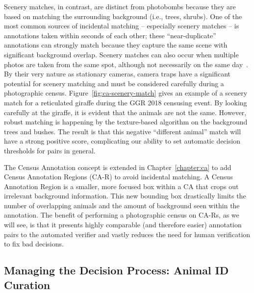 Scenery matches, in contrast, are distinct from photobombs because they are based on matching the surrounding background (i.e., trees, shrubs).  One of the most common sources of incidental matching -- especially scenery matches -- is annotations taken within seconds of each other; these ``near-duplicate'' annotations can strongly match because they capture the same scene with significant background overlap.  Scenery matches can also occur when multiple photos are taken from the same spot, although not necessarily on the same day~\cite{beery_recognition_2018}.  By their very nature as stationary cameras, camera traps have a significant potential for scenery matching and must be considered carefully during a photographic census.  Figure~\ref{fig:ca-scenery-match} gives an example of a scenery match for a reticulated giraffe during the GGR 2018 censusing event.  By looking carefully at the giraffe, it is evident that the animals are not the same. However, robust matching is happening by the texture-based algorithm on the background trees and bushes.  The result is that this negative ``different animal'' match will have a strong positive score, complicating our ability to set automatic decision thresholds for pairs in general.

The Census Annotation concept is extended in Chapter~\ref{chapter:ca} to add Census Annotation Regions (CA-R) to avoid incidental matching.  A Census Annotation Region is a smaller, more focused box within a CA that crops out irrelevant background information.  This new bounding box drastically limits the number of overlapping animals and the amount of background seen within the annotation.  The benefit of performing a photographic census on CA-Rs, as we will see, is that it presents highly comparable (and therefore easier) annotation pairs to the automated verifier and vastly reduces the need for human verification to fix bad decisions.

\subsection{Managing the Decision Process: Animal ID Curation}

